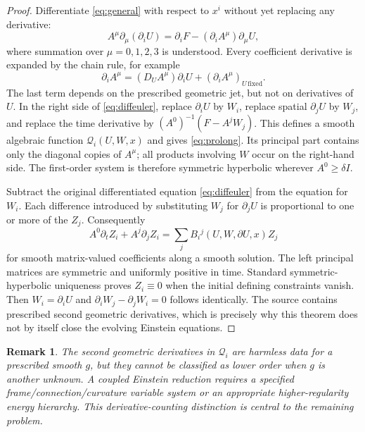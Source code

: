 \documentclass[10pt,a4paper]{article}
\newtheorem{remark}[theorem]{Remark}
\begin{document}
\begin{proof}
Differentiate \eqref{eq:general} with respect to $x^i$ without yet replacing any derivative:
\begin{equation}\label{eq:diffeuler}
A^\mu\partial_\mu(\partial_iU)=
\partial_iF-(\partial_iA^\mu)\partial_\mu U,
\end{equation}
where summation over $\mu=0,1,2,3$ is understood. Every coefficient derivative is expanded by the chain rule, for example
\[
\partial_iA^\mu=(D_UA^\mu)\partial_iU+(\partial_iA^\mu)_{U\,\mathrm{fixed}}.
\]
The last term depends on the prescribed geometric jet, but not on derivatives of $U$. In the right side of \eqref{eq:diffeuler}, replace $\partial_iU$ by $W_i$, replace spatial $\partial_jU$ by $W_j$, and replace the time derivative by $(A^0)^{-1}(F-A^jW_j)$. This defines a smooth algebraic function $\mathcal Q_i(U,W,x)$ and gives \eqref{eq:prolong}. Its principal part contains only the diagonal copies of $A^\mu$; all products involving $W$ occur on the right-hand side. The first-order system is therefore symmetric hyperbolic wherever $A^0\ge\delta I$.

Subtract the original differentiated equation \eqref{eq:diffeuler} from the equation for $W_i$. Each difference introduced by substituting $W_j$ for $\partial_jU$ is proportional to one or more of the $Z_j$. Consequently
\begin{equation}\label{eq:Zhomog}
A^0\partial_tZ_i+A^j\partial_jZ_i
=\sum_j B_i{}^j(U,W,\partial U,x)Z_j
\end{equation}
for smooth matrix-valued coefficients along a smooth solution. The left principal matrices are symmetric and uniformly positive in time. Standard symmetric-hyperbolic uniqueness proves $Z_i\equiv0$ when the initial defining constraints vanish. Then $W_i=\partial_iU$ and $\partial_iW_j-\partial_jW_i=0$ follows identically. The source contains prescribed second geometric derivatives, which is precisely why this theorem does not by itself close the evolving Einstein equations.
\end{proof}

\begin{remark}
The second geometric derivatives in $\mathcal Q_i$ are harmless data for a prescribed smooth $g$, but they cannot be classified as lower order when $g$ is another \emph{unknown}. A coupled Einstein reduction requires a specified frame/connection/curvature variable system or an appropriate higher-regularity energy hierarchy. This derivative-counting distinction is central to the remaining problem.
\end{remark}
\end{document}
